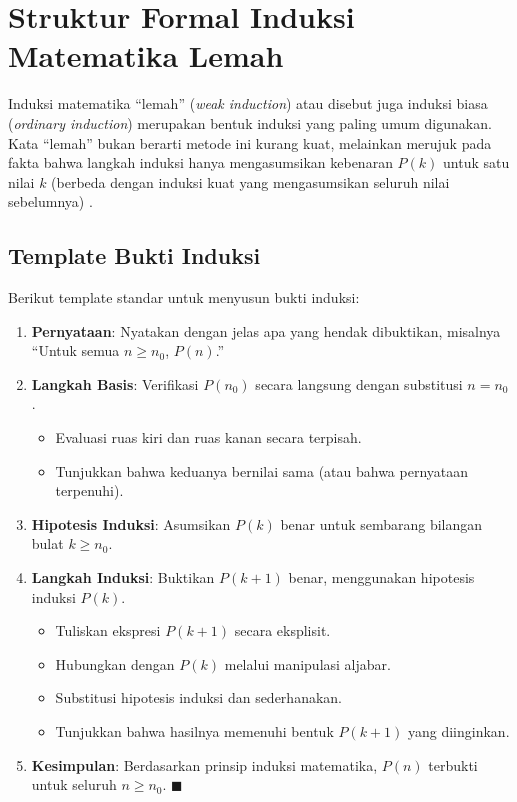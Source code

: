 \section{Struktur Formal Induksi Matematika Lemah}

Induksi matematika ``lemah'' (\textit{weak induction}) atau disebut juga induksi biasa (\textit{ordinary induction}) merupakan bentuk induksi yang paling umum digunakan. Kata ``lemah'' bukan berarti metode ini kurang kuat, melainkan merujuk pada fakta bahwa langkah induksi hanya mengasumsikan kebenaran $P(k)$ untuk satu nilai $k$ (berbeda dengan induksi kuat yang mengasumsikan seluruh nilai sebelumnya) \cite{rosen2019}.

\subsection{Template Bukti Induksi}

Berikut template standar untuk menyusun bukti induksi:

\begin{enumerate}
    \item \textbf{Pernyataan}: Nyatakan dengan jelas apa yang hendak dibuktikan, misalnya ``Untuk semua $n \geq n_0$, $P(n)$.''

    \item \textbf{Langkah Basis}: Verifikasi $P(n_0)$ secara langsung dengan substitusi $n = n_0$.
    \begin{itemize}
        \item Evaluasi ruas kiri dan ruas kanan secara terpisah.
        \item Tunjukkan bahwa keduanya bernilai sama (atau bahwa pernyataan terpenuhi).
    \end{itemize}

    \item \textbf{Hipotesis Induksi}: Asumsikan $P(k)$ benar untuk sembarang bilangan bulat $k \geq n_0$.

    \item \textbf{Langkah Induksi}: Buktikan $P(k+1)$ benar, menggunakan hipotesis induksi $P(k)$.
    \begin{itemize}
        \item Tuliskan ekspresi $P(k+1)$ secara eksplisit.
        \item Hubungkan dengan $P(k)$ melalui manipulasi aljabar.
        \item Substitusi hipotesis induksi dan sederhanakan.
        \item Tunjukkan bahwa hasilnya memenuhi bentuk $P(k+1)$ yang diinginkan.
    \end{itemize}

    \item \textbf{Kesimpulan}: Berdasarkan prinsip induksi matematika, $P(n)$ terbukti untuk seluruh $n \geq n_0$. $\blacksquare$
\end{enumerate}

